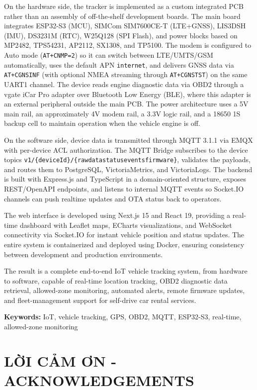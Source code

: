 \documentclass[a4paper]{extarticle}
\newcommand{\majorheading}[1]{%
  \clearpage
  \phantomsection
  \section*{#1}%
  \addcontentsline{toc}{section}{#1}%
}
\begin{document}
On the hardware side, the tracker is implemented as a custom integrated
PCB rather than an assembly of off-the-shelf development boards. The
main board integrates ESP32-S3 (MCU), SIMCom SIM7600CE-T (LTE+GNSS),
LIS3DSH (IMU), DS3231M (RTC), W25Q128 (SPI Flash), and power blocks based
on MP2482, TPS54231, AP2112, SX1308, and TP5100. The modem is configured
to Auto mode (\texttt{AT+CNMP=2}) so it can switch between LTE/UMTS/GSM
automatically, uses the default APN \texttt{internet}, and delivers GNSS
data via \texttt{AT+CGNSINF} (with optional NMEA streaming through
\texttt{AT+CGNSTST}) on the same UART1 channel. The device reads engine
diagnostic data via OBD2 through a vgate iCar Pro adapter over Bluetooth
Low Energy (BLE), where this adapter is an external peripheral outside
the main PCB. The power architecture uses a 5V main rail, an
approximately 4V modem rail, a 3.3V logic rail, and a 18650 1S backup
cell to maintain operation when the vehicle engine is off.

On the software side, device data is transmitted through MQTT 3.1.1 via
EMQX with per-device ACL authorization. The MQTT Bridge subscribes to
the device topics
\texttt{v1/\{deviceId\}/\{rawdata\textbar status\textbar events\textbar firmware\}},
validates the payloads, and routes them to PostgreSQL, VictoriaMetrics,
and VictoriaLogs. The backend is built with Express.js and TypeScript in
a domain-oriented structure, exposes REST/OpenAPI endpoints, and listens
to internal MQTT events so Socket.IO channels can push realtime updates
and OTA status back to operators.

The web interface is developed using Next.js 15 and React 19, providing
a real-time dashboard with Leaflet maps, ECharts visualizations, and
WebSocket connectivity via Socket.IO for instant vehicle position and
status updates. The entire system is containerized and deployed using
Docker, ensuring consistency between development and production
environments.

The result is a complete end-to-end IoT vehicle tracking system, from
hardware to software, capable of real-time location tracking, OBD2
diagnostic data retrieval, allowed-zone monitoring, automated alerts,
remote firmware updates, and fleet-management support for self-drive car
rental services.

\textbf{Keywords:} IoT, vehicle tracking, GPS, OBD2, MQTT, ESP32-S3,
real-time, allowed-zone monitoring

\majorheading{LỜI CẢM ƠN - ACKNOWLEDGEMENTS}\label{lux1eddi-cux1ea3m-ux1a1n---acknowledgements}
\end{document}
